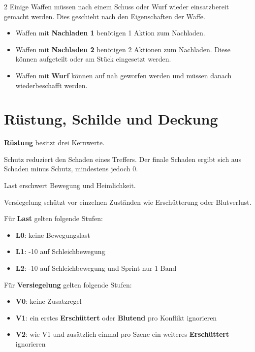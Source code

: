 \begin{multicols*}{2}
Einige Waffen müssen nach einem Schuss oder Wurf wieder einsatzbereit gemacht werden.
Dies geschieht nach den Eigenschaften der Waffe.

\begin{itemize}[leftmargin=*]
\item Waffen mit \textbf{Nachladen 1} benötigen 1 Aktion zum Nachladen.
\item Waffen mit \textbf{Nachladen 2} benötigen 2 Aktionen zum Nachladen. Diese können aufgeteilt oder am Stück eingesetzt werden.
\item Waffen mit \textbf{Wurf} können auf nah geworfen werden und müssen danach wiederbeschafft werden.
\end{itemize}

\section{Rüstung, Schilde und Deckung}\label{sec:rustung}

\textbf{Rüstung} besitzt drei Kernwerte.

\begin{description}[style=nextline,leftmargin=0pt]
\item[\textbf{Schutz}] Schutz reduziert den Schaden eines Treffers. Der finale Schaden ergibt sich aus Schaden minus Schutz, mindestens jedoch 0.
\item[\textbf{Last}] Last erschwert Bewegung und Heimlichkeit.
\item[\textbf{Versiegelung}] Versiegelung schützt vor einzelnen Zuständen wie Erschütterung oder Blutverlust.
\end{description}

Für \textbf{Last} gelten folgende Stufen:

\begin{itemize}[leftmargin=*]
\item \textbf{L0}: keine Bewegungslast
\item \textbf{L1}: -10 auf Schleichbewegung
\item \textbf{L2}: -10 auf Schleichbewegung und Sprint nur 1 Band
\end{itemize}

Für \textbf{Versiegelung} gelten folgende Stufen:

\begin{itemize}[leftmargin=*]
\item \textbf{V0}: keine Zusatzregel
\item \textbf{V1}: ein erstes \textbf{Erschüttert} oder \textbf{Blutend} pro Konflikt ignorieren
\item \textbf{V2}: wie V1 und zusätzlich einmal pro Szene ein weiteres \textbf{Erschüttert} ignorieren
\end{itemize}


\end{multicols*}

